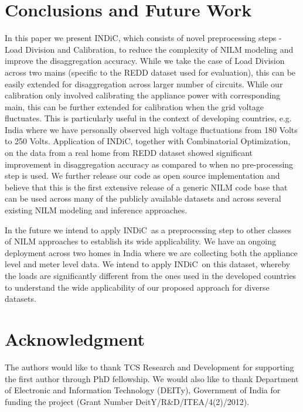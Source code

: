 \documentclass[conference]{IEEEtran}
\newcommand{\indic}{INDiC~}
\newcommand{\indicns}{INDiC}
\begin{document}
\section{Conclusions and Future Work}
\vspace{-1mm}
\noindent In this paper we present \indicns, which consists of novel preprocessing steps - Load Division and Calibration, to reduce the complexity of NILM modeling and improve the disaggregation accuracy. While we take the case of Load Division across two mains (specific to the REDD dataset used for evaluation), this can be easily extended for disaggregation across larger number of circuits. While our calibration only involved calibrating the appliance power with corresponding main, this can be further extended for calibration when the grid voltage fluctuates. This is particularly useful in the context of developing countries, e.g. India where we have personally observed high voltage fluctuations from 180 Volts to 250 Volts. Application of \indicns, together with Combinatorial Optimization, on the data from a real home from REDD dataset showed significant improvement in disaggregation accuracy as compared to when no pre-processing step is used. We further release our code as open source implementation and believe that this is the first extensive release of a generic NILM code base that can be used across many of the publicly available datasets and across several existing NILM modeling and inference approaches. 

\noindent In the future we intend to apply \indic as a preprocessing step to other classes of NILM approaches to establish its wide applicability. We have an ongoing deployment across two homes in India where we are collecting both the appliance level and meter level data. We intend to apply \indic on this dataset, whereby the loads are significantly different from the ones used in the developed countries to understand the wide applicability of our proposed approach for diverse datasets.


\vspace{-3mm}
\section*{Acknowledgment}
\vspace{-1.5mm}
The authors would like to thank TCS Research and Development for supporting the first author through PhD fellowship. We would also like to thank Department of Electronic and Information Technology (DEITy), Government of India for funding the project (Grant Number DeitY/R\&D/ITEA/4(2)/2012).

\vspace{-3mm}


\end{document}

